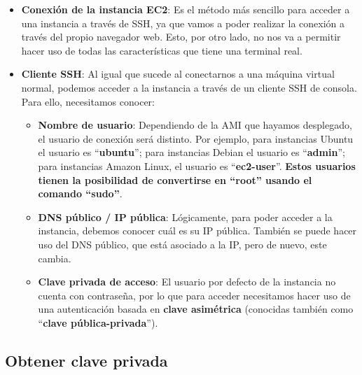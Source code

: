 \begin{itemize}
	\item \textbf{Conexión de la instancia EC2}: Es el método más sencillo para acceder a una instancia a través de SSH, ya que vamos a poder realizar la conexión a través del propio navegador web. Esto, por otro lado, no nos va a permitir hacer uso de todas las características que tiene una terminal real.
	
	\item \textbf{Cliente SSH}: Al igual que sucede al conectarnos a una máquina virtual normal,  podemos acceder a la instancia a través de un cliente SSH de consola. Para ello, necesitamos conocer:
	\begin{itemize}
		\item \textbf{Nombre de usuario}: Dependiendo de la AMI que hayamos desplegado, el usuario de conexión será distinto. Por ejemplo, para instancias Ubuntu el usuario es “\textbf{ubuntu}”; para instancias Debian el usuario es “\textbf{admin}”; para instancias Amazon Linux, el usuario es “\textbf{ec2-user}”. \textbf{Estos usuarios tienen la posibilidad de convertirse en “root” usando el comando “sudo”}.


		\item \textbf{DNS público / IP pública}: Lógicamente, para poder acceder a la instancia, debemos conocer cuál es su IP pública. También se puede hacer uso del DNS público, que está asociado a la IP, pero de nuevo, este cambia.
		
		
		\item \textbf{Clave privada de acceso}: El usuario por defecto de la instancia no cuenta con contraseña, por lo que para acceder necesitamos hacer uso de una autenticación basada en \textbf{clave asimétrica} (conocidas también como “\textbf{clave pública-privada}”).
		
		
	\end{itemize}
\end{itemize}


\subsection{Obtener clave privada}

